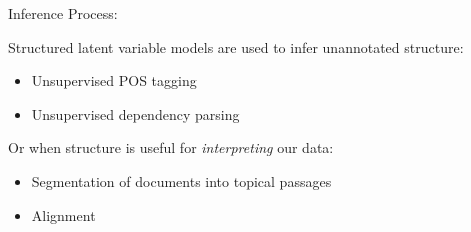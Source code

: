 \begin{frame}
Inference Process:

\begin{center}
\end{center}


Structured latent variable models are used to infer unannotated structure:

\begin{itemize}
    \item Unsupervised POS tagging~\citep{brown1992class,merialdo1994tagging,smith2005contrastive}
    \item Unsupervised dependency parsing~\citep{klein2004corpus,headden2009improving}
\end{itemize}


Or when structure is useful for \textit{interpreting} our data:
\begin{itemize}
    \item Segmentation of documents into topical passages~\citep{hearst1997texttiling}
    \item Alignment~\citep{vogel1996hmm}
\end{itemize}
\end{frame}

